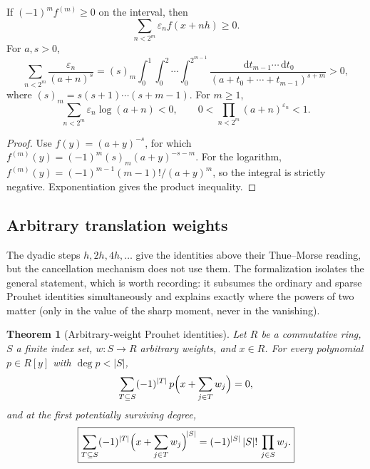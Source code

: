 \documentclass[11pt,oneside]{article}
\numberwithin{equation}{section}
\newtheorem{theorem}{Theorem}[section]
\theoremstyle{definition}
\theoremstyle{remark}
\newcommand{\dd}{\,\mathrm d}
\newcommand{\eps}{\varepsilon}
\begin{document}
\begin{corollary}
\label{p1:cor:complete-monotone}
If \((-1)^mf^{(m)}\ge0\) on the interval, then
\begin{equation}
  \sum_{n<2^m}\eps_nf(x+nh)\ge0.
  \label{p1:eq:complete-monotone-sign}
\end{equation}
For \(a,s>0\),
\begin{equation}
  \boxed{
  \sum_{n<2^m}\frac{\eps_n}{(a+n)^s}
  =(s)_m
  \int_0^1\int_0^2\cdots\int_0^{2^{m-1}}
  \frac{\dd t_{m-1}\cdots\dd t_0}
       {(a+t_0+\cdots+t_{m-1})^{s+m}}>0,}
  \label{p1:eq:reciprocal-power-positive}
\end{equation}
where \((s)_m=s(s+1)\cdots(s+m-1)\).
For \(m\ge1\),
\begin{equation}
  \sum_{n<2^m}\eps_n\log(a+n)<0,
  \qquad
  0<\prod_{n<2^m}(a+n)^{\eps_n}<1.
  \label{p1:eq:log-product-sign}
\end{equation}
\end{corollary}

\begin{proof}
Use \(f(y)=(a+y)^{-s}\), for which
\(f^{(m)}(y)=(-1)^m(s)_m(a+y)^{-s-m}\).  For the logarithm,
\(f^{(m)}(y)=(-1)^{m-1}(m-1)!/(a+y)^m\), so the integral is strictly negative.
Exponentiation gives the product inequality.
\end{proof}

\subsection{Arbitrary translation weights}
\label{p1:sec:arbitrary-weights}

The dyadic steps \(h,2h,4h,\dots\) give the identities above their
Thue--Morse reading, but the cancellation mechanism does not use them.  The
formalization isolates the general statement, which is worth recording: it
subsumes the ordinary and sparse Prouhet identities simultaneously and
explains exactly where the powers of two matter (only in the value of the
sharp moment, never in the vanishing).

\begin{theorem}[Arbitrary-weight Prouhet identities]
\label{p1:thm:arbitrary-weights}
Let \(R\) be a commutative ring, \(S\) a finite index set,
\(w\colon S\to R\) arbitrary weights, and \(x\in R\).  For every
polynomial \(p\in R[y]\) with \(\deg p<|S|\),
\begin{equation}
  \sum_{T\subseteq S}(-1)^{|T|}
   \,p\Bigl(x+\sum_{j\in T}w_j\Bigr)=0,
  \label{p1:eq:arbitrary-weight-cancel}
\end{equation}
and at the first potentially surviving degree,
\begin{equation}
  \boxed{
  \sum_{T\subseteq S}(-1)^{|T|}
   \Bigl(x+\sum_{j\in T}w_j\Bigr)^{\!|S|}
  =(-1)^{|S|}\,|S|!\,\prod_{j\in S}w_j.}
  \label{p1:eq:arbitrary-weight-sharp}
\end{equation}
\end{theorem}
\end{document}

